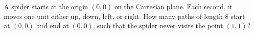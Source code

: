 A spider starts at the origin $(0,0)$ on the Cartesian plane. Each second, it moves one unit either up, down, left, or right. How many paths of length $8$ start at $(0,0)$ and end at $(0,0)$, such that the spider never visits the point $(1,1)$?
